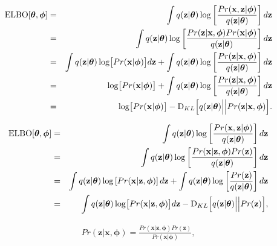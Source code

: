\documentclass[letterpaper,twoside,openany, titlepage,oldfontcommands,titles,dvipsnames]{memoir}
\begin{document}
\begin{eqnarray}\label{eq:vae_bound_tight}
 \mbox{ELBO}[\boldsymbol\theta, \boldsymbol\phi] &=& \int q(\mathbf{z}|\boldsymbol\theta) \log\left[\frac{ Pr(\mathbf{x},\mathbf{z}|\boldsymbol\phi)}{q(\mathbf{z}|\boldsymbol\theta)} \right]d\mathbf{z}\nonumber \\
 &=& \int q(\mathbf{z}|\boldsymbol\theta) \log\left[\frac{ Pr(\mathbf{z}|\mathbf{x},\boldsymbol\phi)Pr(\mathbf{x}|\boldsymbol\phi)}{q(\mathbf{z}|\boldsymbol\theta)} \right]d\mathbf{z}\nonumber \\
 &=& \int q(\mathbf{z}|\boldsymbol\theta)
 \log\bigl[Pr(\mathbf{x}|\boldsymbol\phi)\bigr]d\mathbf{z} +\int q(\mathbf{z}|\boldsymbol\theta) \log\left[\frac{ Pr(\mathbf{z}|\mathbf{x},\boldsymbol\phi)}{q(\mathbf{z}|\boldsymbol\theta)} \right]d\mathbf{z} \nonumber\nonumber \\
 &=& \log\bigl[Pr(\mathbf{x} |\boldsymbol\phi)\bigr] +\int q(\mathbf{z}|\boldsymbol\theta) \log\left[\frac{ Pr(\mathbf{z}|\mathbf{x},\boldsymbol\phi)}{q(\mathbf{z}|\boldsymbol\theta)} \right]d\mathbf{z} \nonumber \\
 &=& \log\bigl[Pr(\mathbf{x} |\boldsymbol\phi)\bigr] -\mbox{D}_{KL}\Bigl[ q(\mathbf{z}|\boldsymbol\theta) \Bigl|\Bigr|Pr(\mathbf{z}|\mathbf{x},\boldsymbol\phi)\Bigr].\label{eq:vae_ELBOEvidenceKL}
 \end{eqnarray}

\begin{eqnarray}\label{eq:vae_elbo_reform2}
 \mbox{ELBO}[\boldsymbol\theta, \boldsymbol\phi] &=& \int q(\mathbf{z}|\boldsymbol\theta) \log\left[\frac{ Pr(\mathbf{x},\mathbf{z}|\boldsymbol\phi)}{q(\mathbf{z}|\boldsymbol\theta)} \right]d\mathbf{z}\nonumber \\
 &=& \int q(\mathbf{z}|\boldsymbol\theta) \log\left[\frac{ Pr(\mathbf{x}|\mathbf{z},\boldsymbol\phi)Pr(\mathbf{z})}{q(\mathbf{z}|\boldsymbol\theta)} \right]d\mathbf{z}\nonumber \\
 &=& \int q(\mathbf{z}|\boldsymbol\theta) \log\left[ Pr(\mathbf{x}|\mathbf{z},\boldsymbol\phi) \right]d\mathbf{z}
 + \int q(\mathbf{z}|\boldsymbol\theta) \log\left[\frac{Pr(\mathbf{z})}{q(\mathbf{z}|\boldsymbol\theta)}\right]d\mathbf{z}
 \nonumber \\
  &=& \int q(\mathbf{z}|\boldsymbol\theta) \log\bigl[ Pr(\mathbf{x}|\mathbf{z},\boldsymbol\phi) \bigr]d\mathbf{z}
 - \mbox{D}_{KL}\Bigl[ q(\mathbf{z}|\boldsymbol\theta)\Bigl|\Bigr|Pr(\mathbf{z})\Bigr],
 \end{eqnarray}

\begin{eqnarray}\label{eq:vae_NonLinearLVMBayes}
  Pr(\mathbf{z}|\mathbf{x},\boldsymbol\phi) = \frac{Pr(\mathbf{x}|\mathbf{z},\boldsymbol\phi)Pr(\mathbf{z})}{Pr(\mathbf{x}|\boldsymbol\phi)},
 \end{eqnarray}
\end{document}
